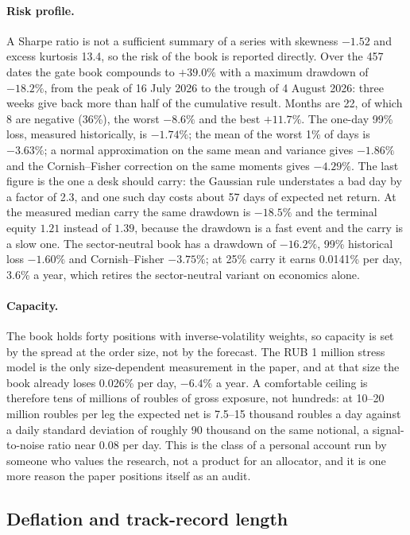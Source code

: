 \paragraph{Risk profile.} A Sharpe ratio is not a sufficient summary of a series with skewness $-1.52$ and excess kurtosis 13.4, so the risk of the book is reported directly. Over the 457 dates the gate book compounds to $+39.0\%$ with a maximum drawdown of $-18.2\%$, from the peak of 16 July 2026 to the trough of 4 August 2026: three weeks give back more than half of the cumulative result. Months are 22, of which 8 are negative (36\%), the worst $-8.6\%$ and the best $+11.7\%$. The one-day 99\% loss, measured historically, is $-1.74\%$; the mean of the worst 1\% of days is $-3.63\%$; a normal approximation on the same mean and variance gives $-1.86\%$ and the Cornish--Fisher correction on the same moments gives $-4.29\%$. The last figure is the one a desk should carry: the Gaussian rule understates a bad day by a factor of 2.3, and one such day costs about 57 days of expected net return. At the measured median carry the same drawdown is $-18.5\%$ and the terminal equity $1.21$ instead of $1.39$, because the drawdown is a fast event and the carry is a slow one. The sector-neutral book has a drawdown of $-16.2\%$, 99\% historical loss $-1.60\%$ and Cornish--Fisher $-3.75\%$; at 25\% carry it earns 0.0141\% per day, 3.6\% a year, which retires the sector-neutral variant on economics alone.

\paragraph{Capacity.} The book holds forty positions with inverse-volatility weights, so capacity is set by the spread at the order size, not by the forecast. The RUB 1 million stress model is the only size-dependent measurement in the paper, and at that size the book already loses 0.026\% per day, $-6.4$\% a year. A comfortable ceiling is therefore tens of millions of roubles of gross exposure, not hundreds: at 10--20 million roubles per leg the expected net is 7.5--15 thousand roubles a day against a daily standard deviation of roughly 90 thousand on the same notional, a signal-to-noise ratio near 0.08 per day. This is the class of a personal account run by someone who values the research, not a product for an allocator, and it is one more reason the paper positions itself as an audit.

\subsection{Deflation and track-record length}

